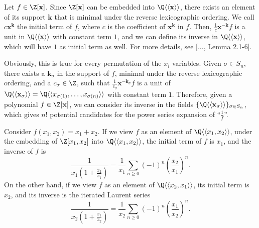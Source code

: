 \documentclass[11pt,e-only]{amsart}
\begin{document}
Let $f\in\Z[\mathbf{x}]$. Since $\Z[\mathbf{x}]$ can be embedded into $\Q\langle\langle\mathbf{x}\rangle\rangle$, there exists an element of its support $\mathbf{k}$ that is minimal under the reverse lexicographic ordering. We call $c\mathbf{x}^\mathbf{k}$ the initial term of $f$, where $c$ is the coefficient of $\mathbf{x}^\mathbf{k}$ in $f$. Then, $\frac{1}{c}\mathbf{x}^{-\mathbf{k}}f$ is a unit in $\Q\langle\langle\mathbf{x}\rangle\rangle$ with constant term $1$, and we can define its inverse in $\Q\langle\langle\mathbf{x}\rangle\rangle$, which will have $1$ as initial term as well. For more details, see [..., Lemma 2.1-6].

Obviously, this is true for every permutation of the $x_i$ variables. Given $\sigma\in S_{n}$, there exists a $\mathbf{k}_\sigma$ in the support of $f$, minimal under the reverse lexicographic ordering, and a $c_{\sigma}\in\Z$, such that $\frac{1}{c_\sigma}\mathbf{x}^{-\mathbf{k}_\sigma}f$ is a unit of $\Q\langle\langle \mathbf{x}_\sigma\rangle\rangle=\Q\langle\langle x_{\sigma(1)},\dots,x_{\sigma(n)}\rangle\rangle$ with constant term $1$. Therefore, given a polynomial $f\in\Z[\mathbf{x}]$, we can consider its inverse in the fields $\{\Q\langle\langle \mathbf{x}_\sigma\rangle\rangle\}_{\sigma\in S_n}$, which gives $n!$ potential candidates for the power series expansion of ``$\frac{1}{f}$''.

\begin{example} Consider $f(x_1,x_2)=x_1+x_2$. If we view $f$ as an element of $\Q\langle\langle x_1,x_2\rangle\rangle$, under the embedding of $\Z[x_1,x_2]$ into $\Q\langle\langle x_1,x_2\rangle\rangle$, the initial term of $f$ is $x_1$, and the inverse of $f$ is
\begin{equation}
    \frac{1}{x_1\left(1+\frac{x_2}{x_1}\right)} = \frac{1}{x_1}\sum_{n\geq 0} (-1)^n\left(\frac{x_2}{x_1}\right)^n.
\end{equation}
On the other hand, if we view $f$ as an element of $\Q\langle\langle x_2,x_1\rangle\rangle$, its initial term is $x_2$, and its inverse is the iterated Laurent series
\begin{equation}
    \frac{1}{x_2\left(1+\frac{x_1}{x_2}\right)} = \frac{1}{x_2}\sum_{n\geq 0} (-1)^n\left(\frac{x_1}{x_2}\right)^n.
\end{equation}
\end{example}
\end{document}
